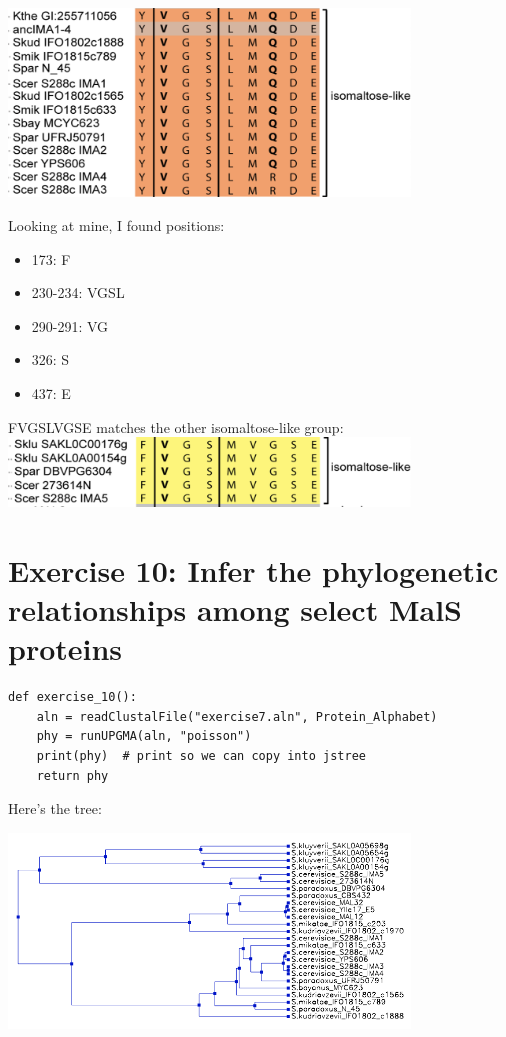 \documentclass{article} %
\begin{document}
\includegraphics[width=0.8\textwidth]{images/mine.png}

\par Looking at mine, I found positions: \\

\begin{itemize}
    \item 173: F
    \item 230-234: VGSL
    \item 290-291: VG
    \item 326: S
    \item 437: E
\end{itemize}

FVGSLVGSE matches the other isomaltose-like group: \\

\includegraphics[width=0.8\textwidth]{images/ima1.png}

\section{Exercise 10: Infer the phylogenetic relationships among select MalS proteins}

\begin{verbatim}
def exercise_10():
    aln = readClustalFile("exercise7.aln", Protein_Alphabet)
    phy = runUPGMA(aln, "poisson")
    print(phy)  # print so we can copy into jstree
    return phy
\end{verbatim}

Here's the tree:

\includegraphics[width=0.8\textwidth]{images/tree.png}
\end{document}

